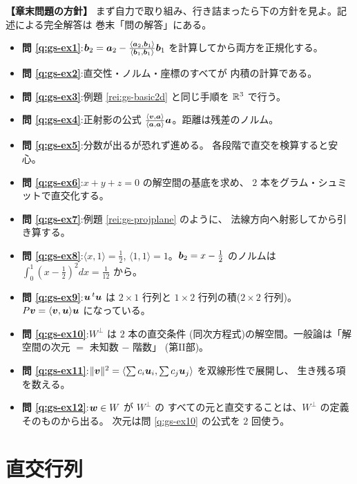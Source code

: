 \bigskip
{\small
\noindent\textbf{【章末問題の方針】}\quad
まず自力で取り組み、行き詰まったら下の方針を見よ。記述による完全解答は
巻末「問の解答」にある。
\begin{itemize}
\item \textbf{問 \ref{q:gs-ex1}}:$\bm{b}_2 = \bm{a}_2 -
\frac{\langle \bm{a}_2, \bm{b}_1 \rangle}{\langle \bm{b}_1, \bm{b}_1 \rangle}
\bm{b}_1$ を計算してから両方を正規化する。
\item \textbf{問 \ref{q:gs-ex2}}:直交性・ノルム・座標のすべてが
内積の計算である。
\item \textbf{問 \ref{q:gs-ex3}}:例題 \ref{rei:gs-basic2d} と同じ手順を
$\mathbb{R}^3$ で行う。
\item \textbf{問 \ref{q:gs-ex4}}:正射影の公式
$\frac{\langle \bm{v}, \bm{a} \rangle}{\langle \bm{a}, \bm{a} \rangle}
\bm{a}$。距離は残差のノルム。
\item \textbf{問 \ref{q:gs-ex5}}:分数が出るが恐れず進める。
各段階で直交を検算すると安心。
\item \textbf{問 \ref{q:gs-ex6}}:$x + y + z = 0$ の解空間の基底を求め、
$2$ 本をグラム・シュミットで直交化する。
\item \textbf{問 \ref{q:gs-ex7}}:例題 \ref{rei:gs-projplane} のように、
法線方向へ射影してから引き算する。
\item \textbf{問 \ref{q:gs-ex8}}:$\langle x, 1 \rangle = \frac{1}{2}$,
$\langle 1, 1 \rangle = 1$。$\bm{b}_2 = x - \frac{1}{2}$ のノルムは
$\int_0^1 (x - \frac{1}{2})^2 dx = \frac{1}{12}$ から。
\item \textbf{問 \ref{q:gs-ex9}}:$\bm{u}\,{}^t\bm{u}$ は
$2 \times 1$ 行列と $1 \times 2$ 行列の積($2 \times 2$ 行列)。
$P\bm{v} = \langle \bm{v}, \bm{u} \rangle \bm{u}$ になっている。
\item \textbf{問 \ref{q:gs-ex10}}:$W^{\perp}$ は $2$ 本の直交条件
(同次方程式)の解空間。一般論は「解空間の次元 $=$ 未知数 $-$ 階数」
(第II部)。
\item \textbf{問 \ref{q:gs-ex11}}:$\|\bm{v}\|^2 =
\langle \sum c_i\bm{u}_i, \sum c_j\bm{u}_j \rangle$ を双線形性で展開し、
生き残る項を数える。
\item \textbf{問 \ref{q:gs-ex12}}:$\bm{w} \in W$ が $W^{\perp}$ の
すべての元と直交することは、$W^{\perp}$ の定義そのものから出る。
次元は問 \ref{q:gs-ex10} の公式を $2$ 回使う。
\end{itemize}
}

\chapter{直交行列}\label{chap:orth}

